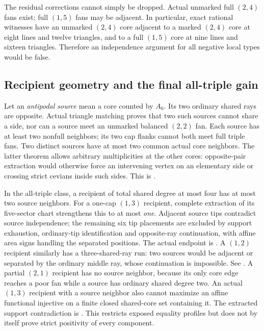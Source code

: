 The residual corrections cannot simply be dropped. Actual unmarked
full $(2,4)$ fans exist; full $(1,5)$ fans may be adjacent. In particular,
exact rational witnesses have an unmarked $(2,4)$ core adjacent to a
marked $(2,4)$ core at eight lines and twelve triangles, and to a full
$(1,5)$ core at nine lines and sixteen triangles. Therefore an independence
argument for all negative local types would be false.

\subsection{Recipient geometry and the final all-triple gain}
\label{upper:source-free}

Let an \emph{antipodal source} mean a core counted by $A_0$. Its two
ordinary shared rays are opposite. Actual triangle matching proves that
two such sources cannot share a side, nor can a source meet an unmarked
balanced $(2,2)$ fan. Each source has at least two nonfull neighbors;
its two cap flanks cannot both meet full triple fans. Two distinct sources
have at most two common actual core neighbors. The latter theorem allows
arbitrary multiplicities at the other cores: opposite-pair extraction
would otherwise force an intervening vertex on an elementary side or
crossing strict cevians inside such sides. This is
.

In the all-triple class, a recipient of total shared degree at most four
has at most two source neighbors. For a one-cap $(1,3)$ recipient,
complete extraction of its five-sector chart strengthens this to at most
\emph{one}. Adjacent source tips contradict source independence; the
remaining six tip placements are excluded by support exhaustion,
ordinary-tip identification and opposite-ray continuation, with affine
area signs handling the separated positions. The actual endpoint is
.
A $(1,2)$ recipient similarly has a three-shared-ray run: two sources
would be adjacent or separated by the ordinary middle ray, whose
continuation is impossible. See
.
A partial $(2,1)$ recipient has no source neighbor, because its only core
edge reaches a poor fan while a source has ordinary shared degree two.
An actual $(1,3)$ recipient with a source neighbor also cannot maximize
an affine functional injective on a finite closed shared-core set containing
it. The extracted support contradiction is
.
This restricts exposed equality profiles but does not by itself prove
strict positivity of every component.


